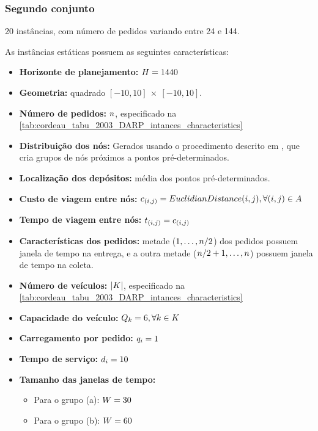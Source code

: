 \documentclass{anpet}
\begin{document}
\subsubsection{Segundo conjunto \parencite{cordeau_tabu_2003}}
20 instâncias, com número de pedidos variando entre 24 e 144.

As instâncias estáticas possuem as seguintes características:
\begin{itemize}
    \item \textbf{Horizonte de planejamento:} $H=1440$
    \item \textbf{Geometria:} quadrado $[-10, 10]\ \times \ [-10, 10]$.
    \item \textbf{Número de pedidos:} $n$, especificado na \autoref{tab:cordeau_tabu_2003_DARP_intances_characteristics}
    \item \textbf{Distribuição dos nós:} Gerados usando o procedimento descrito em \textcite{cordeau_tabu_1997}, que cria grupos de nós próximos a pontos pré-determinados.
    \item \textbf{Localização dos depósitos:} média dos pontos pré-determinados.
    \item \textbf{Custo de viagem entre nós:} $c_{(i,j)} = EuclidianDistance(i,j), \forall (i,j) \in A$
    \item \textbf{Tempo de viagem entre nós:} $t_{(i,j)} = c_{(i,j)}$
    \item \textbf{Características dos pedidos:} metade ($1,\ldots,n/2$) dos pedidos possuem janela de tempo na entrega, e a outra metade ($n/2 + 1, \ldots, n$) possuem janela de tempo na coleta.
    \item \textbf{Número de veículos:} $|K|$, especificado na \autoref{tab:cordeau_tabu_2003_DARP_intances_characteristics}
    \item \textbf{Capacidade do veículo:} $Q_{k}=6,\forall k \in K$
    \item \textbf{Carregamento por pedido:} $q_i = 1$
    \item \textbf{Tempo de serviço:} $d_{i{}} = 10$ 
    \item \textbf{Tamanho das janelas de tempo:} 
    \begin{itemize}
        \item Para o grupo (a): $W = 30$
        \item Para o grupo (b): $W = 60$

\end{itemize}
\end{itemize}
\end{document}
